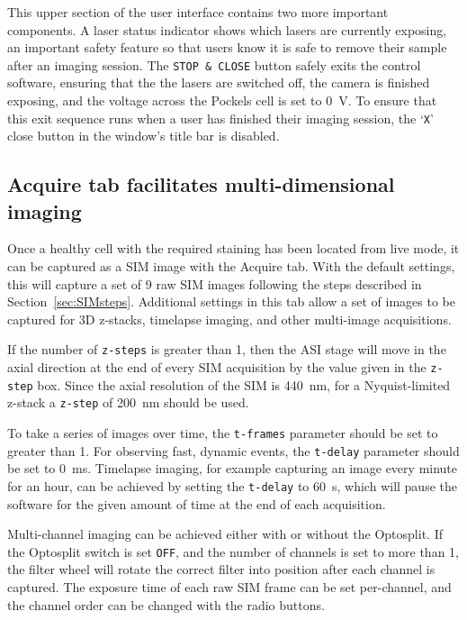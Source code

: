 
This upper section of the user interface contains two more important components. 
A laser status indicator shows which lasers are currently exposing, an important safety feature so that users know it is safe to remove their sample after an imaging session. 
The \texttt{STOP \& CLOSE} button safely exits the control software, ensuring that the the lasers are switched off, the camera is finished exposing, and the voltage across the Pockels cell is set to \SI{0}{\volt}. 
To ensure that this exit sequence runs when a user has finished their imaging session, the `\texttt{X}' close button in the window's title bar is disabled. 

\subsection{Acquire tab facilitates multi-dimensional imaging}
Once a healthy cell with the required staining has been located from live mode, it can be captured as a SIM image with the Acquire tab. 
With the default settings, this will capture a set of 9 raw SIM images following the steps described in Section~\ref{sec:SIMsteps}.
Additional settings in this tab allow a set of images to be captured for 3D z-stacks, timelapse imaging, and other multi-image acquisitions. 

If the number of \texttt{z-steps} is greater than 1, then the ASI stage will move in the axial direction at the end of every SIM acquisition by the value given in the \texttt{z-step} box. 
Since the axial resolution of the SIM is \SI{440}{\nano\meter}, for a Nyquist-limited z-stack a \texttt{z-step} of \SI{200}{\nano\meter} should be used. 

To take a series of images over time, the \texttt{t-frames} parameter should be set to greater than 1.
For observing fast, dynamic events, the \texttt{t-delay} parameter should be set to \SI{0}{\milli\second}. 
Timelapse imaging, for example capturing an image every minute for an hour, can be achieved by setting the \texttt{t-delay} to \SI{60}{\second}, which will pause the software for the given amount of time at the end of each acquisition. 

Multi-channel imaging can be achieved either with or without the Optosplit. 
If the Optosplit switch is set \texttt{OFF}, and the number of channels is set to more than 1, the filter wheel will rotate the correct filter into position after each channel is captured. 
The exposure time of each raw SIM frame can be set per-channel, and the channel order can be changed with the radio buttons. 

